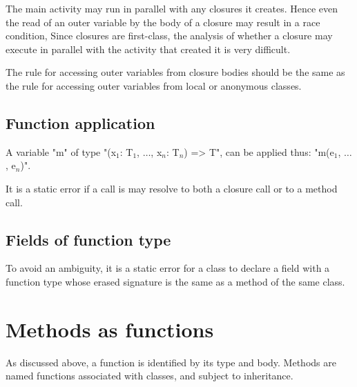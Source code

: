 \begin{note}
The main activity may run in parallel with any
closures it creates. Hence even the read of an outer variable by the
body of a closure may result in a race condition, Since closures are
first-class, the analysis of whether a closure may execute in parallel
with the activity that created it is very difficult.
\end{note}

\begin{note}
The rule for accessing outer variables from closure bodies
should be the same as the rule for accessing outer variables from local
or anonymous classes.
\end{note}

\subsection{Function application}

A variable \xcd"m" of type
\xcdmath"(x$_1$: T$_1$, $\dots$, x$_n$: T$_n$) => T",
can be applied thus:
\xcdmath"m(e$_1$, $\dots$, e$_n$)".

It is a static error if a call is may resolve to both a closure call or
to a method call.


\subsection{Fields of function type}

To avoid an ambiguity, it is a static error for a class to declare a
field with a function type whose erased signature is the same as a
method of the same class.

\section{Methods as functions}

As discussed above, a function is identified by its type and body.
Methods are named functions associated with classes, and subject to
inheritance.

